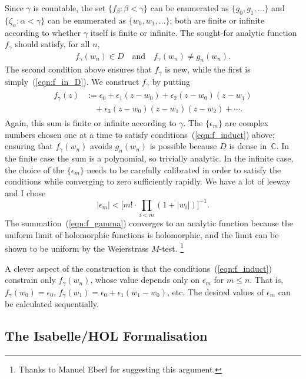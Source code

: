 \documentclass[runningheads]{llncs}
\begin{document}
Since $\gamma$ is countable, the set $\{f_\beta: \beta<\gamma\}$ can be enumerated as $\{g_0, g_1, \ldots\}$
and $\{\zeta_\alpha : \alpha < \gamma\}$ can be enumerated as $\{w_0, w_1, \ldots\}$;
both are finite or infinite according to whether $\gamma$ itself is finite or infinite.
The sought-for analytic function $f_\gamma$ should satisfy, for all $n$,
\begin{align}
	f_\gamma (w_n) \in D \quad\text{and}\quad f_\gamma (w_n) \not= g_n(w_n). \label{eqn:f_induct}
\end{align}
%
The second condition above ensures that $f_\gamma$ is new, while the first is simply~(\ref{eqn:f_in_D}).
We construct $f_\gamma$ by putting
\begin{align}
\begin{split}
f_\gamma(z) & := \epsilon_0 + \epsilon_1 (z - w_0) + \epsilon_2 (z - w_0)(z - w_1)\\
	       & \quad + \epsilon_3 (z - w_0)(z - w_1)(z - w_2) + \cdots.	\label{eqn:f_gamma}
\end{split}
\end{align}
Again, this sum is finite or infinite according to $\gamma$. 
The $\{\epsilon_m\}$ are complex numbers chosen one at a time to satisfy conditions~(\ref{eqn:f_induct}) above; 
ensuring that $f_\gamma (w_n)$ avoids $g_n(w_n)$ is possible because $D$ is dense in~$\mathbb{C}$\@.
In the finite case the sum is a polynomial, so trivially analytic. 
In the infinite case, the choice of the $\{\epsilon_m\}$ needs to be carefully calibrated in order to satisfy the conditions while converging to zero sufficiently rapidly. 
We have a lot of leeway and I chose $$|\epsilon_m| < \bigl[m! \cdot \prod_{i<m} (1 + |w_i|)\bigr]^{-1}. $$
The summation~(\ref{eqn:f_gamma}) converges to an analytic function because the uniform limit of holomorphic functions is holomorphic, and the limit can be shown to be uniform by the Weierstrass $M$-test.%
\footnote{Thanks to Manuel Eberl for suggesting this argument.}

A clever aspect of the construction is that the conditions~(\ref{eqn:f_induct}) constrain only $f_\gamma(w_n)$, 
whose value depends only on $\epsilon_m$ for $m\le n$. That is, $f_\gamma(w_0) = \epsilon_0$, $f_\gamma(w_1) = \epsilon_0 + \epsilon_1 (w_1 - w_0)$, etc.
The desired values of $\epsilon_m$ can be calculated sequentially.

\subsection{The Isabelle/HOL Formalisation}
\end{document}
